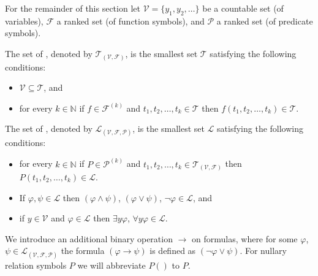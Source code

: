 For the remainder of this section let $\mathcal{V}=\{y_1,y_2,\dots\}$ be a countable set (of variables), $\mathcal{F}$ a ranked set (of function symbols), and $\mathcal{P}$ a ranked set (of predicate symbols).
\begin{definition}
	The set of , denoted by $\mathcal{T}_{(\mathcal{V},\mathcal{F})}$, is the smallest set $\mathcal{T}$ satisfying the following conditions:
	\begin{itemize}
		\item $\mathcal{V} \subseteq \mathcal{T}$, and
		\item for every $k\in\mathbb{N}$ if $f\in\mathcal{F}^{(k)}$ and $t_1,t_2,\dots,t_k\in\mathcal{T}$ then $f(t_1,t_2,\dots,t_k)\in\mathcal{T}$.
	\end{itemize}
	The set of , denoted by $\mathcal{L}_{(\mathcal{V},\mathcal{F},\mathcal{P})}$, is the smallest set $\mathcal{L}$ satisfying the following conditions:
	\begin{itemize}
		\item for every $k\in\mathbb{N}$ if $P\in\mathcal{P}^{(k)}$ and $t_1,t_2,\dots,t_k\in\mathcal{T}_{(\mathcal{V},\mathcal{F})}$ then $P(t_1,t_2,\dots,t_k)\in\mathcal{L}$.
		\item If $\varphi,\psi\in\mathcal{L}$ then $(\varphi\wedge\psi)$, $(\varphi\vee\psi)$, $\neg \varphi\in\mathcal{L}$, and
		\item if $y\in\mathcal{V}$ and $\varphi\in\mathcal{L}$ then $\exists y\varphi$, $\forall y\varphi\in\mathcal{L}$. %
	\end{itemize}
\end{definition}
We introduce an additional binary operation $\to$ on formulas, where for some $\varphi$, $\psi\in\mathcal{L}_{(\mathcal{V},\mathcal{F},\mathcal{P})}$ the formula $(\varphi\to\psi)$ is defined as $(\neg\varphi\vee\psi)$. For nullary relation symbols $P$ we will abbreviate $P()$ to $P$. 

